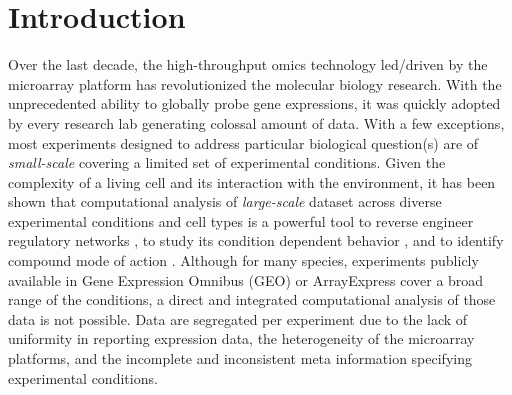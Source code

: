 %
%


\section{Introduction}

Over the last decade, the high-throughput omics technology led/driven by the 
microarray platform has revolutionized the molecular biology research. 
With the unprecedented ability to globally probe gene expressions, it was 
quickly adopted by every research lab generating colossal amount of data. 
With a few exceptions, most experiments designed to address particular 
biological question(s) are of \textit{small-scale} covering a limited set of 
experimental conditions.
Given the complexity of a living cell and its interaction with the 
environment, it has been shown that computational analysis of 
\textit{large-scale} dataset across diverse experimental conditions and cell 
types is a powerful tool to reverse engineer regulatory networks 
\cite{Faith2007, Basso2005, Ernst2008}, to study its condition dependent 
behavior \cite{Lemmens2009, Fadda2009}, and to identify compound mode of 
action  \cite{Gardner2003, Basso2005, DiBernardo2005}.
Although for many species, experiments publicly available in Gene Expression 
Omnibus (GEO) \cite{Barrett2011} or ArrayExpress \cite{Parkinson2009} cover 
a broad range of the conditions, a direct and integrated computational analysis 
of those data is not possible.
Data are segregated per experiment due to the lack of uniformity in 
reporting expression data, the heterogeneity of the microarray platforms, 
and the incomplete and inconsistent meta information specifying experimental 
conditions.

